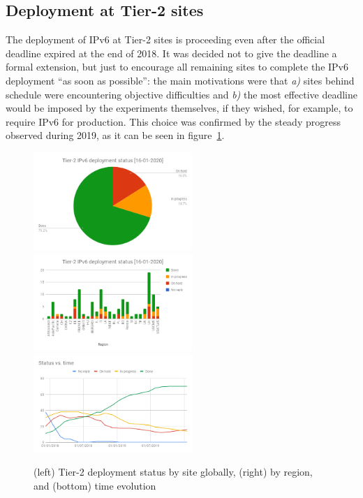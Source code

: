 \subsection{Deployment at Tier-2 sites}
The deployment of IPv6 at Tier-2 sites is proceeding even after the
official deadline expired at the end of 2018. It was decided not to
give the deadline a formal extension, but just to encourage all
remaining sites to complete the IPv6 deployment ``as soon as
possible'': the main motivations were that \emph{a)} sites behind
schedule were encountering objective difficulties and \emph{b)} the
most effective deadline would be imposed by the experiments
themselves, if they wished, for example, to require IPv6 for
production. This choice was confirmed by the steady progress observed
during 2019, as it can be seen in figure~\ref{fig:t2depl}.
\begin{figure}[t]
\centering
\includegraphics[width=6cm]{chart2}
\includegraphics[width=6cm]{chart}
\includegraphics[width=6cm]{chart3}
\caption{(left) Tier-2 deployment status by site globally, (right) by region, and (bottom) time evolution}
\label{fig:t2depl}
\end{figure}

